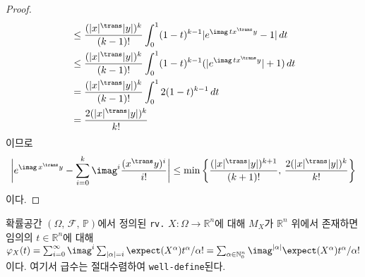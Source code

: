 \begin{proof}
\begin{align*}
        &\leq\frac{(|x|^\trans|y|)^k}{(k-1)!}\int_0^1(1-t)^{k-1}|e^{\imag\,tx^\trans y}-1|\,dt\\
        &\leq\frac{(|x|^\trans|y|)^k}{(k-1)!}\int_0^1(1-t)^{k-1}(|e^{\imag\,tx^\trans y}|+1)\,dt\\
        &=\frac{(|x|^\trans|y|)^k}{(k-1)!}\int_0^12(1-t)^{k-1}\,dt\\
        &=\frac{2(|x|^\trans|y|)^k}{k!}
    \end{align*}
    이므로
    \begin{equation*}
        \bigg|e^{\imag\,x^\trans y}-\sum_{i=0}^k\imag^i\frac{(x^\trans y)^i}{i!}\bigg|\leq\min\bigg\{\frac{(|x|^\trans|y|)^{k+1}}{(k+1)!},\,\frac{2(|x|^\trans|y|)^k}{k!}\bigg\}
    \end{equation*}
    이다.
\end{proof}

\begin{theorem}\label{thm:CFTaylor}
    확률공간 $(\Omega,\,\mathcal{F},\,\mathbb{P})$에서 정의된 \texttt{rv.} $X:\Omega\to\mathbb{R}^n$에 대해 $M_X$가 $\mathbb{R}^n$ 위에서 존재하면 임의의 $t\in\mathbb{R}^n$에 대해 $\varphi_X(t)=\sum_{i=0}^\infty\imag^i\sum_{|\alpha|=i}\expect(X^\alpha)t^\alpha/\alpha!=\sum_{\alpha\in\mathbb{N}_0^n}\imag^{|\alpha|}\expect(X^\alpha)t^\alpha/\alpha!$이다. 여기서 급수는 절대수렴하여 \texttt{well-define}된다.
\end{theorem}

